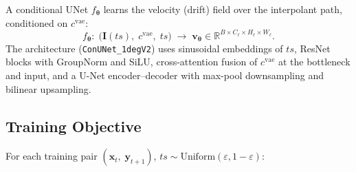 \documentclass[11pt]{article}
\begin{document}
A conditional UNet $f_{\bm{\theta}}$ learns the velocity (drift) field over
the interpolant path, conditioned on $c^{\mathrm{vae}}$:
\begin{equation}
  f_{\bm{\theta}} :\;
  \bigl(\mathbf{I}(ts),\; c^{\mathrm{vae}},\; ts\bigr)
  \;\longrightarrow\;
  \mathbf{v}_{\bm{\theta}}
  \in \mathbb{R}^{B \times C_\ell \times H_\ell \times W_\ell}.
\end{equation}
The architecture (\texttt{ConUNet\_1degV2}) uses sinusoidal embeddings of $ts$,
ResNet blocks with GroupNorm and SiLU, cross-attention fusion of $c^{\mathrm{vae}}$
at the bottleneck and input, and a U-Net encoder--decoder with max-pool
downsampling and bilinear upsampling.

\subsection{Training Objective}

For each training pair $(\mathbf{x}_t,\;\mathbf{y}_{t+1})$, $ts \sim
\mathrm{Uniform}(\varepsilon, 1{-}\varepsilon)$:
\end{document}
